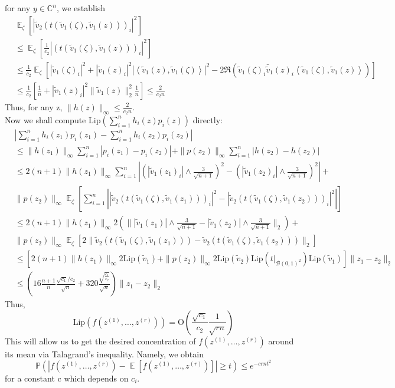 \documentclass[11pt]{article}
\newcommand{\<}{\langle}
\renewcommand{\>}{\rangle}
\newcommand{\E}{\operatorname{\mathbb{E}}}
\numberwithin{equation}{section}
\newcommand{\lip}{\text{Lip}}
\newcommand{\Prob}{\mathbb{P}}
\begin{document}
for any $y \in \mathbb{C}^n$, we establish
\begin{align*}
&\E_{\zeta} \left[|\tilde{v}_2(t(\tilde{v}_1(\zeta),\tilde{v}_1(z)))_i|^2\right] \\
&\leq \E_{\zeta} \left[\frac{1}{c_2}|(t(\tilde{v}_1(\zeta),\tilde{v}_1(z)))_i|^2\right]\\
&\leq \frac{1}{c_2} \E_{\zeta}\left[  |\tilde{v}_1(\zeta)_i|^2 + |\tilde{v}_1(z)_i|^2 \left|\left< \tilde{v}_1(z),\tilde{v}_1(\zeta) \right> \right| ^2 - 2\Re(\tilde{v}_1(\zeta)_i \bar{\tilde{v}}_1 (z)_i  \left< \tilde{v}_1(\zeta),\tilde{v}_1(z) \right>) \right]\\
& \leq \frac{1}{c_2}\left[ \frac{1}{n} + |\tilde{v}_1(z)_i|^2 \|\tilde{v}_1(z)\|_2^2 \frac{1}{n} \right] \leq \frac{2}{c_2 n}
\end{align*}
Thus, for any z, $\|h(z)\|_{\infty} \leq \frac{2}{c_2 n}$.\\

Now we shall compute $\lip(\sum_{i=1}^{n}h_i(z)p_i(z))$ directly:
\begin{align*}
&\left| \sum_{i=1}^{n}h_i(z_1)p_i(z_1) - \sum_{i=1}^{n}h_i(z_2)p_i(z_2) \right|\\
&\leq \|h(z_1)\|_{\infty}\sum_{i=1}^{n}\left|  p_i(z_1)-p_i(z_2) \right| + \|p(z_2)\|_{\infty}\sum_{i=1}^{n}\left| h(z_2)-h(z_2) \right|\\
&\leq 2(n+1)\|h(z_1)\|_{\infty} \sum_{i=1}^{n}\left|( |\tilde{v}_1(z_1)_i|\wedge \frac{3}{\sqrt{n+1}})^2 - (|\tilde{v}_1(z_2)_i|\wedge \frac{3}{\sqrt{n+1}})^2\right|+\\
& \|p(z_2)\|_{\infty} \E_\zeta\left[ \sum_{i=1}^{n}\left| |\tilde{v}_2(t(\tilde{v}_1(\zeta),\tilde{v}_1(z_1)))_i|^2 - |\tilde{v}_2(t(\tilde{v}_1(\zeta),\tilde{v}_1(z_2)))_i|^2  \right|  \right]\\
&\leq 2(n+1)\|h(z_1)\|_{\infty}2(\||\tilde{v}_1(z_1)|\wedge \frac{3}{\sqrt{n+1}} - |\tilde{v}_1(z_2)|\wedge \frac{3}{\sqrt{n+1}}  \|_2)+\\
&\|p(z_2)\|_{\infty} \E_{\zeta}\left[  2\| \tilde{v}_2(t(\tilde{v}_1(\zeta),\tilde{v}_1(z_1)))-\tilde{v}_2(t(\tilde{v}_1(\zeta),\tilde{v}_1(z_2)))  \|_2 \right]\\
&\leq \left[ 2(n+1)\|h(z_1)\|_{\infty}2\lip(\tilde{v}_1) + \|p(z_2)\|_{\infty} 2 \lip(\tilde{v}_2)\lip(t|_{\mathcal{B}(0,1)^2})\lip(\tilde{v}_1) \right]\|z_1-z_2\|_2\\
&\leq \left(16\frac{n+1}{ n}\frac{\sqrt{c_1}/c_2}{\sqrt{n}} + 320 \frac{\sqrt{\frac{c_1}{c_2}}}{\sqrt{n}}\right)\|z_1-z_2\|_2
\end{align*}
Thus,
\[
\lip(f(z^{(1)},\ldots,z^{(r)})) =  \text{O}\left( \frac{\sqrt{c_1}}{c_2} \frac{1}{\sqrt{rn}} \right)
\]
This will allow us to get the desired concentration of $f(z^{(1)},\ldots,z^{(r)})$ around its mean via Talagrand's inequality. Namely, we obtain
\[
\Prob\left( \left| f(z^{(1)},\ldots,z^{(r)}) - \E\left[ f(z^{(1)},\ldots,z^{(r)}) \right] \right| \geq t \right) \leq e^{-crnt^2} 
\]
for a constant c which depends on $c_i$.\\
\end{document}
